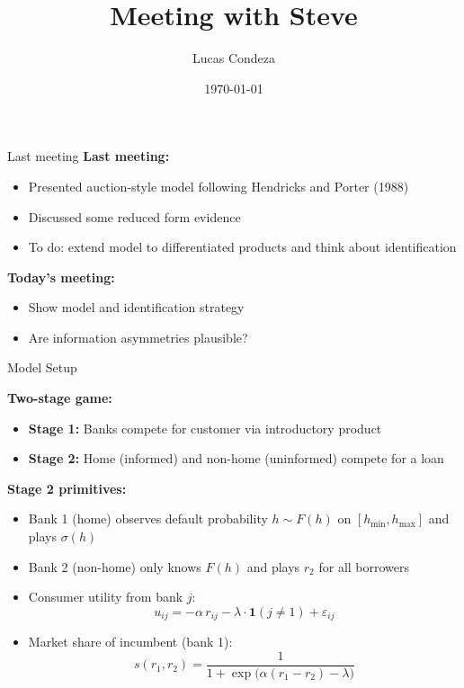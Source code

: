 \documentclass[10pt,aspectratio=169]{beamer}
\title{Meeting with Steve}
\author{%
 Lucas Condeza
\inst{1} \and
}
\institute{
  \inst{1} Yale University \\
}
\date{\today}
\begin{document}


\begin{frame}{Last meeting}
\textbf{Last meeting:}
\begin{itemize}
    \item Presented auction-style model following Hendricks and Porter (1988) 
    \item Discussed some reduced form evidence 
    \item To do: extend model to differentiated products and think about identification
\end{itemize}

\textbf{Today's meeting:}
\begin{itemize}
    \item Show model and identification strategy
    \item Are information asymmetries plausible? 
\end{itemize}
\end{frame}



\begin{frame}{Model Setup}

\textbf{Two-stage game:}
\begin{itemize}
    \item \textbf{Stage 1:} Banks compete for customer via introductory product
    \item \textbf{Stage 2:} Home  (informed) and non-home (uninformed) compete for a loan
\end{itemize}

\vspace{0.2cm}
\textbf{Stage 2 primitives:}
\begin{itemize}
    \item Bank 1 (home) observes default probability $h \sim F(h)$ on $[h_{\min}, h_{\max}]$ and plays $\sigma(h)$
    \item Bank 2 (non-home) only knows $F(h)$ and plays $r_2$ for all borrowers
    \item Consumer utility from bank $j$:
    $$u_{ij} = -\alpha\, r_{ij} - \lambda \cdot \mathbf{1}(j \neq 1) + \varepsilon_{ij}$$
    \item Market share of incumbent (bank 1):
    $$s(r_1, r_2) = \frac{1}{1 + \exp\!\big(\alpha(r_1 - r_2) - \lambda\big)}$$
\end{itemize}
\end{frame}
\end{document}
